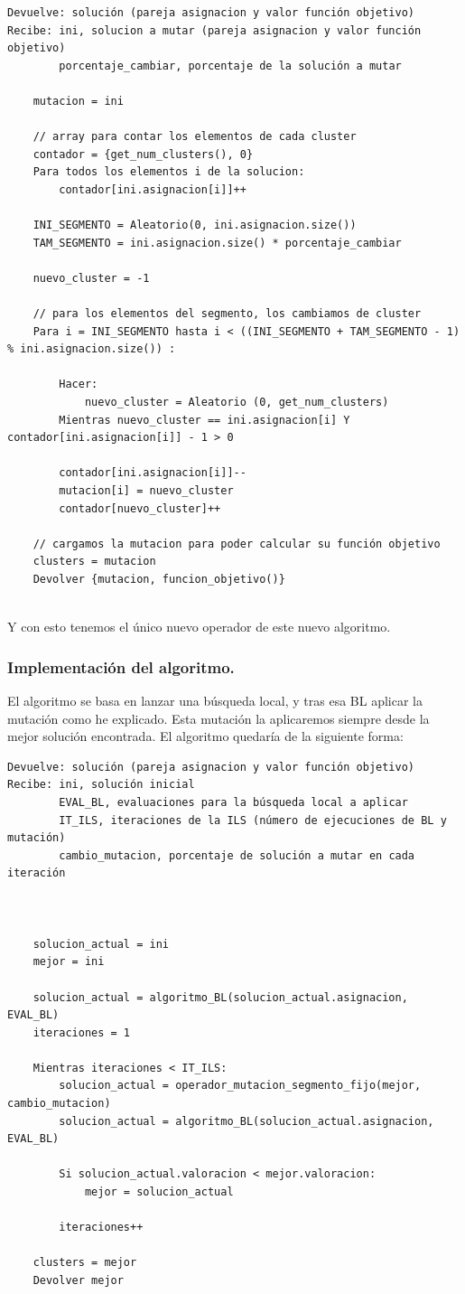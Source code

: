 \documentclass[12pt, spanish]{article}
\begin{document}
\begin{lstlisting}
Devuelve: solución (pareja asignacion y valor función objetivo)
Recibe: ini, solucion a mutar (pareja asignacion y valor función objetivo)
		porcentaje_cambiar, porcentaje de la solución a mutar
		
	mutacion = ini
	
	// array para contar los elementos de cada cluster
	contador = {get_num_clusters(), 0}
	Para todos los elementos i de la solucion:
		contador[ini.asignacion[i]]++
		
	INI_SEGMENTO = Aleatorio(0, ini.asignacion.size())
	TAM_SEGMENTO = ini.asignacion.size() * porcentaje_cambiar
	
	nuevo_cluster = -1
	
	// para los elementos del segmento, los cambiamos de cluster
	Para i = INI_SEGMENTO hasta i < ((INI_SEGMENTO + TAM_SEGMENTO - 1) % ini.asignacion.size()) :
	
		Hacer:
			nuevo_cluster = Aleatorio (0, get_num_clusters)
		Mientras nuevo_cluster == ini.asignacion[i] Y contador[ini.asignacion[i]] - 1 > 0
		
		contador[ini.asignacion[i]]--
		mutacion[i] = nuevo_cluster
		contador[nuevo_cluster]++
	
	// cargamos la mutacion para poder calcular su función objetivo
	clusters = mutacion
	Devolver {mutacion, funcion_objetivo()}	
	
\end{lstlisting}

Y con esto tenemos el único nuevo operador de este nuevo algoritmo.

\subsubsection{Implementación del algoritmo.}

El algoritmo se basa en lanzar una búsqueda local, y tras esa BL aplicar la mutación como he explicado. Esta mutación la aplicaremos siempre desde la mejor solución encontrada. El algoritmo quedaría de la siguiente forma:

\begin{lstlisting}
Devuelve: solución (pareja asignacion y valor función objetivo)
Recibe: ini, solución inicial
		EVAL_BL, evaluaciones para la búsqueda local a aplicar
		IT_ILS, iteraciones de la ILS (número de ejecuciones de BL y mutación)
		cambio_mutacion, porcentaje de solución a mutar en cada iteración



	solucion_actual = ini
	mejor = ini
	
	solucion_actual = algoritmo_BL(solucion_actual.asignacion, EVAL_BL)
	iteraciones = 1
	
	Mientras iteraciones < IT_ILS:
		solucion_actual = operador_mutacion_segmento_fijo(mejor, cambio_mutacion)
		solucion_actual = algoritmo_BL(solucion_actual.asignacion, EVAL_BL)
		
		Si solucion_actual.valoracion < mejor.valoracion:
			mejor = solucion_actual
			
		iteraciones++
	
	clusters = mejor
	Devolver mejor
\end{lstlisting}
\end{document}
